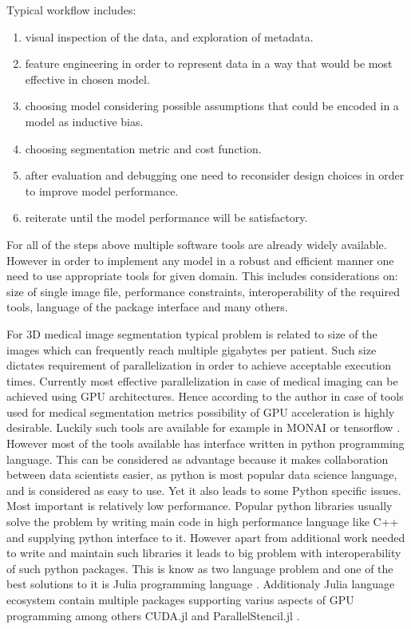 \documentclass[preprint,12pt]{elsarticle}
\begin{document}
Typical workflow includes:
\begin{enumerate}
  \item visual inspection of  the data, and exploration of metadata.
  \item feature engineering in order to represent data in a way that would be most effective in chosen model.
  \item choosing model considering possible assumptions that could be encoded in a model as inductive bias.
  \item choosing segmentation metric and cost function.
  \item after evaluation and debugging one need to reconsider design choices in order to improve model performance.
  \item reiterate until the model performance will be satisfactory.
\end{enumerate}

For all of the steps above multiple software tools are already widely available.
However in order to implement any model in a robust and efficient manner one need to use appropriate tools for given domain. This includes considerations on: size of single image file, performance constraints, interoperability of the required tools, language of the package interface and many others.

For 3D medical image segmentation typical problem is related to size of the images which can frequently reach multiple gigabytes per patient. Such size dictates requirement of parallelization in order to achieve acceptable execution times. Currently most effective parallelization in case of medical imaging can be achieved using GPU architectures.  Hence according to the author in case of tools used for medical segmentation metrics possibility of GPU acceleration is highly desirable. Luckily such tools are available for example in MONAI \cite{MONAI} or tensorflow \cite{tensorflow}. However most of the tools available has interface written in python programming language. This can be considered as advantage because it makes collaboration between data scientists easier, as python is most popular data science language, and is considered as easy to use. Yet it also leads to some Python specific issues. Most important is relatively low performance. Popular python libraries usually solve the problem by writing main code in high performance language like C++ and supplying python interface to it. However apart from additional work needed to write and maintain such libraries it leads to big problem with interoperability of such python packages. This is know as two language problem and one of the best solutions to it is Julia programming language \cite{Julia}. Additionaly Julia language ecosystem contain multiple packages supporting varius aspects of GPU programming among others CUDA.jl \cite{besard2019prototyping} and ParallelStencil.jl \cite{ParallelStencil}.
\end{document}
